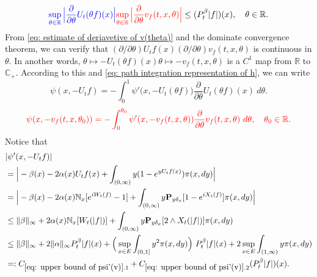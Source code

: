 \documentclass[12pt,oneside,english]{amsart}
\theoremstyle{plain}
\theoremstyle{definition}
\numberwithin{equation}{section}
\newcommand{\added}[1]{{\color{blue}#1}}\newcommand{\deleted}[1]{{\color{red}#1}}
\begin{document}
\begin{equation}
\label{eq: upper bounded for derivative of v(theta)}
    \added{\sup_{\theta \in \mathbb R}\Big| \frac{\partial}{\partial \theta}U_t(\theta f)(x)\Big|}
    \deleted{\sup_{\theta \in \mathbb R}\Big| \frac{\partial}{\partial \theta} v_f(t,x,\theta)\Big|}
    \leq ( P^\beta_t |f|)(x),
    \quad \theta \in \mathbb R.
\end{equation}
    From \deleted{\eqref{eq: estimate of deriavetive of v(theta)} and} the dominate convergence theorem, we can verify that \added{$(\partial/\partial \theta)U_tf(x)$}\deleted{$(\partial/\partial \theta)v_f(t,x,\theta)$} is continuous in $\theta$.
    In another words, \added{$\theta \mapsto -U_t(\theta f)(x)$}\deleted{$\theta \mapsto -v_f(t,x,\theta)$} is a $C^1$ map from $\mathbb R$ to $\mathbb C_+$.
    According to this and \eqref{eq: path integration representation of h}, we can write
\deleted{
\begin{equation}
\label{eq: path integration representation of psi(v)}
    \psi(x,-U_tf) = -\int_0^1 \psi'\big(x,-U_t(\theta f)\big) \frac{\partial}{\partial \theta} U_t(\theta f)(x)~d\theta.
\end{equation}
}
\begin{equation}
    \deleted{\psi(x,-v_f(t,x,\theta_0)) = -\int_0^{\theta_0} \psi'(x,-v_f(t,x,\theta)) \frac{\partial}{\partial \theta} v_f(t,x,\theta)~d\theta,
    \quad \theta_0 \in \mathbb R.}
\end{equation}
    Notice that
\deleted{
\begin{equation}
\label{eq: upper bound of psi'(v)}
\begin{split}
    &|\psi'(x, -U_tf)|
    \\&= \Big| -\beta(x)- 2\alpha(x) U_tf(x)+ \int_{(0,\infty)} y (1- e^{y U_tf(x)} ) \pi(x,dy)\Big|
    \\&= \Big| - \beta(x)- 2\alpha(x)\mathbb N_x[e^{i W_{t}(f)} - 1]  + \int_{(0,\infty)} y \mathbf P_{y \delta_x}[1-e^{i X_{t}(f)}] \pi(x,dy) \Big|
\\ &\leq \|\beta\|_\infty + 2\alpha(x)\mathbb N_x[W_t(|f|)]+ \int_{(0,\infty)} y\mathbf P_{y\delta_x}[2\wedge X_t(|f|)] \pi(x,dy)
\\ &\leq \|\beta\|_\infty + 2\|\alpha\|_\infty  P^\beta_t |f|(x) + \Big(\sup_{x\in E}\int_{(0,1]}y^2 \pi(x,dy)\Big)~P^\beta_t |f|(x) + 2\sup_{x\in E}\int_{(1,\infty)} y \pi(x,dy)
\\ &=: C_{\ref{eq: upper bound of psi'(v)}.1} + C_{\ref{eq: upper bound of psi'(v)}.2}(P^\beta_t |f|)(x).
\end{split}
\end{equation}
}
\end{document}
